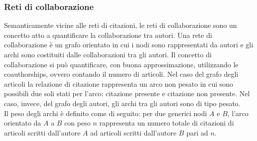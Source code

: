 \documentclass[a4paper, 12pt]{article}
\begin{document}
\subsubsection{Reti di collaborazione}
Semanticamente vicine alle reti di citazioni, le reti di collaborazione sono un concetto atto a quantificare la collaborazione tra autori.
Una rete di collaborazione è un grafo orientato in cui i nodi sono rappresentati da autori e gli archi sono costituiti dalle collaborazioni tra gli autori. Il concetto di collaborazione si può quantificare, con buona approssimazione, utilizzando le coauthorships, ovvero contando il numero di articoli. Nel caso del grafo degli articoli la relazione di citazione rappresenta un arco non pesato in cui sono possibili due soli stati per l'arco: citazione presente e citazione non presente.
Nel caso, invece, del grafo degli autori, gli archi tra gli autori sono di tipo pesato. \\
Il peso degli archi è definito come di seguito: per due generici nodi $A$ e $B$, l'arco orientato da $A$ a $B$ con peso $n$ rappresenta un numero totale di citazioni di articoli scritti dall'autore $A$ ad articoli scritti dall'autore $B$ pari ad $n$.
\end{document}
